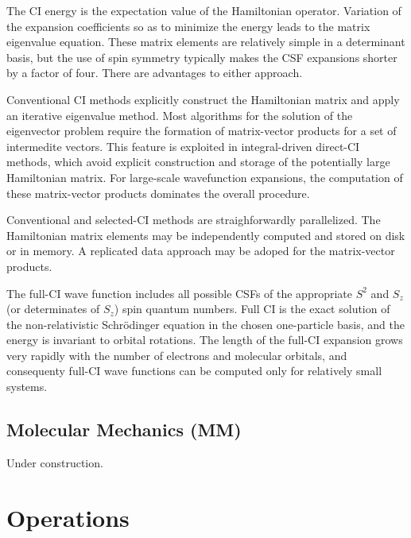 The CI energy is the expectation value of the Hamiltonian operator.  Variation 
of the expansion coefficients so as to minimize the energy leads to the
matrix eigenvalue equation.  These matrix elements are relatively 
simple in a determinant basis, but the use of spin symmetry typically
makes the CSF expansions shorter by a factor of four.  There are
advantages to either approach.

Conventional CI methods explicitly construct the Hamiltonian matrix and
apply an iterative eigenvalue method.  Most algorithms for the solution
of the eigenvector problem require the formation of matrix-vector
products for a set of intermedite vectors.  This feature is exploited in
integral-driven direct-CI methods, which avoid explicit construction
and storage of the potentially large Hamiltonian matrix.  For large-scale
wavefunction expansions, the computation of these matrix-vector products
dominates the overall procedure.

Conventional and selected-CI methods are straighforwardly parallelized.
The Hamiltonian matrix elements may be independently computed and
stored on disk or in memory.  A replicated data approach may be adoped for the
matrix-vector products.

The full-CI wave function includes all possible CSFs of the appropriate 
$S^{2}$ and $S_{z}$ (or determinates of $S_{z}$) spin quantum numbers.  Full CI is the
exact solution of the non-relativistic Schr\"{o}dinger equation in the chosen
one-particle basis, and the energy is invariant to orbital rotations.  The
length of the full-CI expansion grows very rapidly with the number of
electrons and molecular orbitals, and consequenty full-CI wave functions
can be computed only for relatively small systems.

\subsection{Molecular Mechanics (MM)}

Under construction.



\section{Operations}

